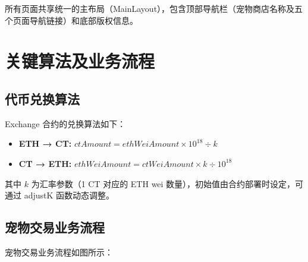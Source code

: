 \documentclass{mancls}
\begin{document}
所有页面共享统一的主布局（MainLayout），包含顶部导航栏（宠物商店名称及五个页面导航链接）和底部版权信息。

\section{关键算法及业务流程}

\subsection{代币兑换算法}

Exchange 合约的兑换算法如下：

\begin{itemize}
	\item \textbf{ETH → CT:} $ctAmount = ethWeiAmount \times 10^{18} \div k$
	\item \textbf{CT → ETH:} $ethWeiAmount = ctWeiAmount \times k \div 10^{18}$
\end{itemize}

其中 $k$ 为汇率参数（1 CT 对应的 ETH wei 数量），初始值由合约部署时设定，可通过 adjustK 函数动态调整。

\subsection{宠物交易业务流程}

宠物交易业务流程如图所示：
\end{document}
